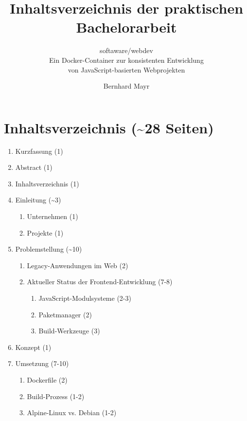 \documentclass[a4paper, parskip=false, ngerman]{scrreprt}
\begin{document}
\title{Inhaltsverzeichnis der praktischen Bachelorarbeit}
\subtitle{softaware/webdev\\Ein Docker-Container zur konsistenten Entwicklung\\von JavaScript-basierten Webprojekten}
\author{Bernhard Mayr}
\maketitle

\chapter{Inhaltsverzeichnis (\textasciitilde28 Seiten)}

\begin{enumerate}[label*=\arabic*.]
    \item Kurzfassung (1)
    \item Abstract (1)
    \item Inhaltsverzeichnis (1)
    \item Einleitung (\textasciitilde3)
    \begin{enumerate}[label*=\arabic*.]
        \item Unternehmen (1)
        \item Projekte (1)
    \end{enumerate}
    \item Problemstellung (\textasciitilde10)
    \begin{enumerate}[label*=\arabic*.]
        \item Legacy-Anwendungen im Web (2)
        \item Aktueller Status der Frontend-Entwicklung (7-8)
        \begin{enumerate}[label*=\arabic*.]
            \item JavaScript-Modulsysteme (2-3)
            \item Paketmanager (2)
            \item Build-Werkzeuge (3)
        \end{enumerate}
    \end{enumerate}
    \item Konzept (1)
    \item Umsetzung (7-10)
    \begin{enumerate}[label*=\arabic*.]
        \item Dockerfile (2)
        \item Build-Prozess (1-2)
        \item Alpine-Linux vs. Debian (1-2)

\end{enumerate}
\end{enumerate}
\end{document}
